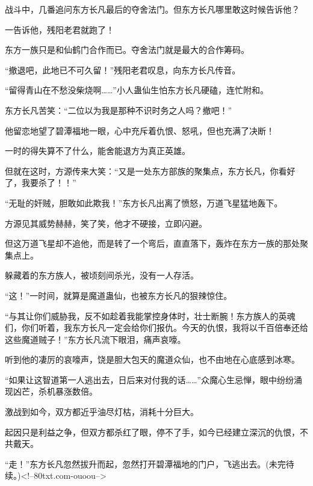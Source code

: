 \begin{this_body}
战斗中，几番追问东方长凡最后的夺舍法门。但东方长凡哪里敢这时候告诉他？

一告诉他，残阳老君就跑了！

东方一族只是和仙鹤门合作而已。夺舍法门就是最大的合作筹码。

“撤退吧，此地已不可久留！”残阳老君叹息，向东方长凡传音。

“留得青山在不愁没柴烧啊……”小人蛊仙生怕东方长凡硬磕，连忙附和。

东方长凡苦笑：“二位以为我是那种不识时务之人吗？撤吧！”

他留恋地望了碧潭福地一眼，心中充斥着仇恨、怒吼，但也充满了决断！

一时的得失算不了什么，能舍能退方为真正英雄。

但就在这时，方源传来大笑：“又是一处东方部族的聚集点，东方长凡，你看好了，我要杀了！！”

“无耻的奸贼，胆敢如此欺我！”东方长凡出离了愤怒，万道飞星猛地轰下。

方源见其威势赫赫，笑了笑，他才不硬接，立即闪避。

但这万道飞星却不追他，而是转了一个弯后，直直落下，轰炸在东方一族的那处聚集点上。

躲藏着的东方族人，被顷刻间杀光，没有一人存活。

“这！”一时间，就算是魔道蛊仙，也被东方长凡的狠辣惊住。

“与其让你们威胁我，反不如趁着我能掌控身体时，壮士断腕！东方族人的英魂们，你们听着，我东方长凡一定会给你们报仇。今天的仇恨，我将以千百倍奉还给这些魔道贼子！”东方长凡流下眼泪，痛声哀嚎。

听到他的凄厉的哀嚎声，饶是胆大包天的魔道众仙，也不由地在心底感到冰寒。

“如果让这智道第一人逃出去，日后来对付我的话……”众魔心生忌惮，眼中纷纷涌现凶芒，杀机暴涨数倍。

激战到如今，双方都近乎油尽灯枯，消耗十分巨大。

起因只是利益之争，但双方都杀红了眼，停不了手，如今已经建立深沉的仇恨，不共戴天。

“走！”东方长凡忽然拔升而起，忽然打开碧潭福地的门户，飞逃出去。(未完待续。)<!--80txt.com-ouoou-->

\end{this_body}

